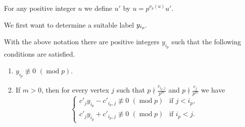 \documentclass[ALCO,ThmDefs,Unicode,epreuves,published]{cedram}
\numberwithin{equation}{section}
\DeclareMathOperator{\md}{mod}
\newcommand*{\Mk}{\mkern -2mu}
\begin{document}
For any positive integer $u$ we define $u'$ by $u=p^{\nu_p(u)} u'$.


We first want to determine a suitable label $y_{i_p}\Mk$. 



\begin{lemm} \label{lem:yip}
With the above notation there are positive integers $y_{i_p}$ such that the following 
conditions are satisfied.
\begin{enumerate}[label=(\roman*)]
\item\label{lemma4.3_i} %
$y_{i_p} \not \equiv 0\,\,(\md p)$.
\item\label{lemma4.3_ii} %
If $m>0$, then for every vertex $j$ such that $p\nmid \frac{c_{i_p,j}}{p^m}$ and $p\nmid \frac{c_{j}}{p^m}$ we have
\begin{equation} \label{eq:ruleout}
\begin{cases} 
c'_j y_{i_p} - c'_{i_p,j}\not \equiv 0\,\,(\md p) &  \mbox{if $j<i_p$}, \\
c'_j y_{i_p} + c'_{i_p,j}\not \equiv 0\,\,(\md p) &  \mbox{if $i_p<j$}.
\end{cases}
\end{equation}
\end{enumerate}
\end{lemm}
\end{document}
